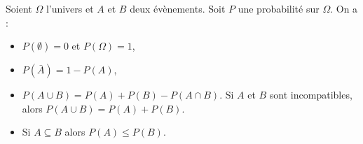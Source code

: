       \begin{prop}
            Soient $\Omega$ l'univers et $A$ et $B$ deux \'ev\`enements.
            Soit $P$ une probabilit\'e sur $\Omega$. On a :
            \begin{itemize}
                  \item $P(\emptyset ) = 0$ et $P(\Omega ) = 1$,
                  \item $P(\bar{A}) = 1 - P(A)$,
                  \item $P(A\cup B) = P(A) + P(B) - P(A\cap B)$.
                        Si $A$ et $B$ sont incompatibles, alors $P(A\cup B) = P(A) + P(B)$.
                  \item Si $A\subseteq B$ alors $P(A) \leq P(B)$.
            \end{itemize}
      \end{prop}
